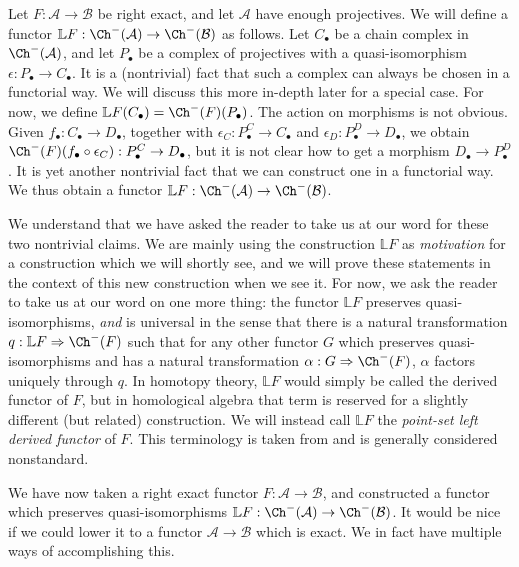 \begin{construction}\label{7.11}
	Let $F : \mathcal{A}  \to \mathcal{B} $ be right exact, and let $\mathcal{A} $ have enough projectives. We will define a functor $\mathbb{L} F : \Ch^-(\mathcal{A} )  \to \Ch^-(\mathcal{B} ) $ as follows. Let $C_{\bullet} $ be a chain complex in $\Ch^-(\mathcal{A} ) $, and let $P_{\bullet} $ be a complex of projectives with a quasi-isomorphism $\epsilon : P_{\bullet} \to C_{\bullet} $. It is a (nontrivial) fact that such a complex can always be chosen in a functorial way. We will discuss this more in-depth later for a special case. For now, we define $\mathbb{L} F(C_{\bullet} )=\Ch^-(F)(P_{\bullet} )$. The action on morphisms is not obvious. Given $f_{\bullet} : C_{\bullet}  \to D_{\bullet} $, together with $\epsilon _C : P_{\bullet}^C  \to C_{\bullet} $ and $\epsilon_D : P^D_{\bullet}  \to D_{\bullet} $, we obtain $\Ch^-(F) (f_{\bullet} \circ \epsilon _C): P_{\bullet} ^C \to D_{\bullet} $, but it is not clear how to get a morphism $D_{\bullet} \to P^D_{\bullet} $. It is yet another nontrivial fact that we can construct one in a functorial way. We thus obtain a functor $\mathbb{L} F : \Ch^-(\mathcal{A} )  \to \Ch^-(\mathcal{B} ) $.
\end{construction}

We understand that we have asked the reader to take us at our word for these two nontrivial claims. We are mainly using the construction $\mathbb{L} F$ as \emph{motivation} for a construction which we will shortly see, and we will prove these statements in the context of this new construction when we see it. For now, we ask the reader to take us at our word on one more thing: the functor $\mathbb{L}F$ preserves quasi-isomorphisms, \emph{and} is universal in the sense that there is a natural transformation $q : \mathbb{L} F \Rightarrow \Ch^-(F)$ such that for any other functor $G$ which preserves quasi-isomorphisms and has a natural transformation $\alpha : G \Rightarrow \Ch^-(F)$, $\alpha $ factors uniquely through $q$. In homotopy theory, $\mathbb{L} F$ would simply be called the derived functor of $F$, but in homological algebra that term is reserved for a slightly different (but related) construction. We will instead call $\mathbb{L}F $ the \emph{point-set left derived functor} of $F$. This terminology is taken from \cite{shulman} and is generally considered nonstandard.

We have now taken a right exact functor $F : \mathcal{A}  \to \mathcal{B} $, and constructed a functor which preserves quasi-isomorphisms $\mathbb{L}F:\Ch^-(\mathcal{A} ) \to \Ch^-(\mathcal{B} ) $. It would be nice if we could lower it to a functor $\mathcal{A} \to \mathcal{B} $ which is exact. We in fact have multiple ways of accomplishing this.

